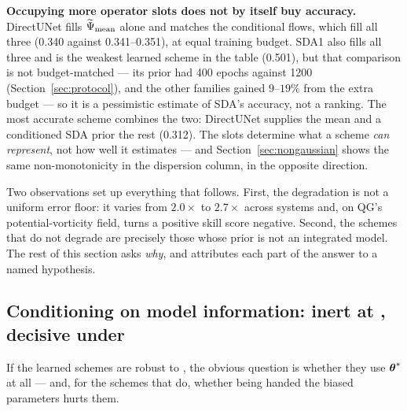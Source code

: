 \textbf{Occupying more operator slots does not by itself buy accuracy.}
DirectUNet fills $\widetilde{\Psi}_{\mathrm{mean}}$ alone and matches the conditional flows, which fill all
three (0.340 against 0.341--0.351), at equal training budget. SDA1 also fills all
three and is the weakest learned scheme in the table (0.501), but that comparison
is not budget-matched --- its prior had 400 epochs against 1200
(Section~\ref{sec:protocol}), and the other families gained $9$--$19\%$ from the
extra budget --- so it is a pessimistic estimate of SDA's accuracy, not a ranking. The most accurate scheme combines the two:
DirectUNet supplies the mean and a conditioned SDA prior the rest (0.312). The
slots determine what a scheme \emph{can represent}, not how well it estimates ---
and Section~\ref{sec:nongaussian} shows the same non-monotonicity in the
dispersion column, in the opposite direction.

Two observations set up everything that follows. First, the degradation is not a
uniform error floor: it varies from $2.0\times$ to $2.7\times$ across systems
and, on QG's potential-vorticity field, turns a positive skill score negative.
Second, the schemes that do not degrade are precisely those whose prior is not an
integrated model. The rest of this section asks \emph{why}, and attributes each
part of the answer to a named hypothesis.

\subsection{Conditioning on model information: inert at \texorpdfstring{\Sz{}}{S0}, decisive under \texorpdfstring{\So{}}{S1}}
\label{sec:inert}

If the learned schemes are robust to \So{}, the obvious question is whether they
use $\boldsymbol{\theta}^{*}$ at all --- and, for the schemes that do, whether being handed the
biased parameters hurts them.

